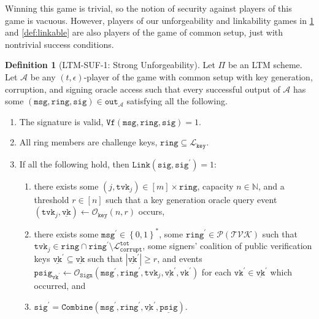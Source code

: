 \documentclass[11pt]{article}
\theoremstyle{definition}
\newtheorem{definition}[definition]{Definition}
\newcommand{\vk}{\texttt{vk}}
\newcommand{\tvk}{\texttt{tvk}}
\newcommand{\ring}{\texttt{ring}}
\newcommand{\VK}{\underline{\texttt{vk}}}
\newcommand{\sig}{\texttt{sig}}
\newcommand{\psig}{\texttt{psig}}
\newcommand{\bitstrings}{\left\{0,1\right\}^*}
\newcommand{\bbn}{\mathbb{N}}
\newcommand{\msg}{\texttt{msg}}
\newcommand{\sign}{\texttt{Sign}}
\newcommand{\combine}{\texttt{Combine}}
\newcommand{\PSIG}{\underline{\psig}}
\newcommand{\verify}{\texttt{Vf}}
\newcommand{\link}{\texttt{Link}}
\newcommand{\verifyshare}{\texttt{VfSh}}
\newcommand{\signingOracle}{\mathcal{O}_{\sign}}
\newcommand{\keyOracle}{\mathcal{O}_{\texttt{key}}}
\newcommand{\challengeKeySet}{\mathcal{L}_{\texttt{key}}}
\newcommand{\corruptedTotalKeys}{\mathcal{L}_{\texttt{corrupt}}^{\texttt{tot}}}
\begin{document}
Winning this game is trivial, so the notion of security against players of this game is vacuous. However, players of our unforgeability and linkability games in \cref{def:suf} and \cref{def:linkable} are also players of the game of common setup, just with nontrivial success conditions.




\begin{definition}[LTM-SUF-1: Strong Unforgeability]\label{def:suf}
Let $\Pi$ be an LTM scheme. Let $\mathcal{A}$ be any $(t,\epsilon)$-player of the game with common setup with key generation, corruption, and signing oracle access such that every successful output of $\mathcal{A}$ has some $(\msg, \ring, \sig) \in \texttt{out}_{\mathcal{A}}$ satisfying all the following.
\begin{enumerate}
\item The signature is valid, $\verify(\msg, \ring, \sig)=1$.

\item All ring members are challenge keys, $\ring \subseteq \challengeKeySet$.

\item If all the following hold, then $\link(\sig, \sig^\prime) = 1$:
\begin{enumerate}
\item there exists some
$(j, \tvk_j) \in [m] \times \ring$, 
capacity  $n \in \bbn$, and a 
threshold $r \in [n]$ such that
a key generation oracle query event $(\tvk_j, \VK) \leftarrow \keyOracle(n,r)$ occurs,
\item there exists some $\msg^\prime \in \bitstrings$, some $\ring^\prime \in \mathcal{P}(\mathcal{TVK})$ such that $\tvk_j \in \ring \cap \ring^\prime \setminus \corruptedTotalKeys$,  some signers' coalition of public verification keys $\VK^\prime \subseteq \VK$ such that $\left|\VK^\prime\right| \geq r$,  and events $\psig_{\vk^\prime} \leftarrow \signingOracle(\msg^\prime, \ring^\prime, \tvk_j, \VK^\prime, \vk^\prime)$ for each $\vk^\prime \in \VK^\prime$ which occurred, and
\item $\sig^\prime = \combine(\msg^\prime,\ring^\prime,\VK^\prime,\PSIG)$.
\end{enumerate}


\end{enumerate}
\end{definition}
\end{document}
